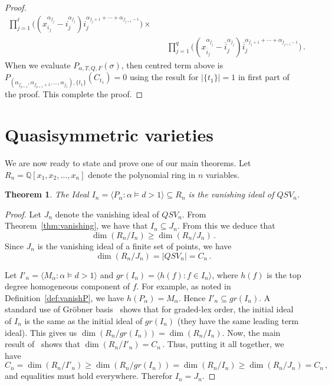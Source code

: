 \documentclass[12pt]{amsart}
\newtheorem{thm}[equation]{Theorem}
\theoremstyle{definition}
\theoremstyle{remark}
\numberwithin{equation}{section}
\newcommand{\QQ}{\mathbb{Q}}
\begin{document}
\begin{proof}
\begin{align*}
		\prod_{j=1}^\ell 
	     	\Big( (x_{i_j}^{\alpha_{f_j}}- i_j^{\alpha_{f_j }})  i_j^{\alpha_{f_j +1}+\cdots+\alpha_{f_{j +1}-1}} \Big)\times\\
		&\quad\prod_{j=1}^q 
	     	\Big( (x_{\overline{i}_j}^{\alpha_{\overline{f}_j}}-\overline{i}_j^{\alpha_{\overline{f}_j }})  \overline{i}_j^{\alpha_{\overline{f}_j +1}+\cdots+\alpha_{\overline{f}_{j +1}-1}} \Big) \,.
\end{align*}
When we evaluate $P_{\alpha,T,Q,F}(\sigma)$, then centred term above is $P_{(\alpha_{\underline{f}_{p+1}}, \alpha_{\underline{f}_{p+1}+1} , \ldots, \alpha_{\overline{f}_1} ),\{t_1\}}(C_{t_1})=0$ using the result for $|\{t_1\}|=1$ in first part of the proof. This complete the proof.
\end{proof}


\section{Quasisymmetric varieties}

We are now ready to state and prove one of our main theorems. Let $R_n=\QQ[x_1,x_2,\ldots,x_n]$ denote the polynomial ring in $n$ variables.

\begin{thm}\label{thm:vanishingQSV} The Ideal $I_n=\langle P_\alpha : \alpha\models d>1\rangle\subseteq R_n$ is the vanishing ideal of $QSV_n$. \end{thm}

\begin{proof}
	Let $J_n$ denote the vanishing ideal of $QSV_n$. From Theorem~\ref{thm:vanishing}, we have that $I_n\subseteq J_n$. From this we deduce that
	 $$ \dim(R_n/I_n) \ge \dim(R_n/J_n)\,.$$
	 Since $J_n$ is the vanishing ideal of a finite set of points, we have 
	 $$ \dim(R_n/J_n)=|QSV_n|=C_n\,.$$
	 
	Let $I'_n=\langle M_\alpha : \alpha\models d>1\rangle$ and $gr(I_n)=\langle h(f) : f\in I_n \rangle$, where $h(f)$ is the top degree homogeneous component of $f$.
	For example, as noted in Definition~\ref{def:vanishP}, we have $h(P_\alpha)=M_\alpha$. Hence $I'_n\subseteq gr(I_n)$. 
	A standard use of Gr\"obner basis~\cite{CLO} shows that for graded-lex order, the initial ideal of $I_n$ is the same as the initial ideal of $gr(I_n)$ (they have the same leading term ideal).
	This gives us $\dim(R_n/gr(I_n)) =  \dim(R_n/I_n)$. Now, the main result of~\cite{ABB} shows that
	$ \dim(R_n/I'_n)=C_n\,.$
	Thus, putting it all together, we have 
	$$C_n= \dim(R_n/I'_n) \ge \dim(R_n/gr(I_n)) =  \dim(R_n/I_n) \ge \dim(R_n/J_n) =C_n\,,$$
	and equalities must hold everywhere. Therefor $I_n=J_n$.
\end{proof}
\end{document}
